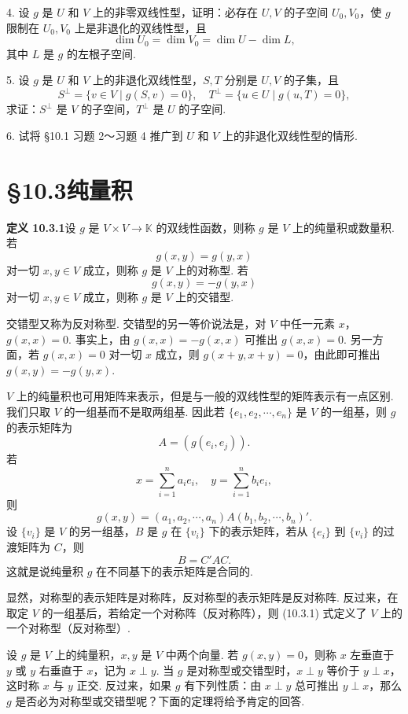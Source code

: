 \documentclass[UTF8,12pt,a4paper,fontset=fandol]{ctexart}
\begin{document}
4. 设 $g$ 是 $U$ 和 $V$ 上的非零双线性型，证明：必存在 $U,V$ 的子空间 $U_0,V_0$，使 $g$ 限制在 $U_0,V_0$ 上是非退化的双线性型，且
\[
  \dim U_0=\dim V_0=\dim U-\dim L,
\]
其中 $L$ 是 $g$ 的左根子空间.

5. 设 $g$ 是 $U$ 和 $V$ 上的非退化双线性型，$S,T$ 分别是 $U,V$ 的子集，且
\[
  S^\perp=\{v\in V\mid g(S,v)=0\},\quad T^\perp=\{u\in U\mid g(u,T)=0\},
\]
求证：$S^\perp$ 是 $V$ 的子空间，$T^\perp$ 是 $U$ 的子空间.

6. 试将 §10.1 习题 2～习题 4 推广到 $U$ 和 $V$ 上的非退化双线性型的情形.

\section*{§10.3\quad 纯量积}

\noindent\textbf{定义 10.3.1}\quad 设 $g$ 是 $V\times V\to\mathbb K$ 的双线性函数，则称 $g$ 是 $V$ 上的纯量积或数量积. 若
\[
  g(x,y)=g(y,x)
\]
对一切 $x,y\in V$ 成立，则称 $g$ 是 $V$ 上的对称型. 若
\[
  g(x,y)=-g(y,x)
\]
对一切 $x,y\in V$ 成立，则称 $g$ 是 $V$ 上的交错型.

交错型又称为反对称型. 交错型的另一等价说法是，对 $V$ 中任一元素 $x$，$g(x,x)=0$. 事实上，由 $g(x,x)=-g(x,x)$ 可推出 $g(x,x)=0$. 另一方面，若 $g(x,x)=0$ 对一切 $x$ 成立，则 $g(x+y,x+y)=0$，由此即可推出 $g(x,y)=-g(y,x)$.

$V$ 上的纯量积也可用矩阵来表示，但是与一般的双线性型的矩阵表示有一点区别. 我们只取 $V$ 的一组基而不是取两组基. 因此若 $\{e_1,e_2,\cdots,e_n\}$ 是 $V$ 的一组基，则 $g$ 的表示矩阵为
\[
  A=(g(e_i,e_j)).
\]
若
\[
  x=\sum_{i=1}^n a_ie_i,\quad y=\sum_{i=1}^n b_ie_i,
\]
则
\begin{equation}
  g(x,y)=(a_1,a_2,\cdots,a_n)A(b_1,b_2,\cdots,b_n)'.
  \tag{10.3.1}
\end{equation}
设 $\{v_i\}$ 是 $V$ 的另一组基，$B$ 是 $g$ 在 $\{v_i\}$ 下的表示矩阵，若从 $\{e_i\}$ 到 $\{v_i\}$ 的过渡矩阵为 $C$，则
\[
  B=C'AC.
\]
这就是说纯量积 $g$ 在不同基下的表示矩阵是合同的.

显然，对称型的表示矩阵是对称阵，反对称型的表示矩阵是反对称阵. 反过来，在取定 $V$ 的一组基后，若给定一个对称阵（反对称阵），则 (10.3.1) 式定义了 $V$ 上的一个对称型（反对称型）.

设 $g$ 是 $V$ 上的纯量积，$x,y$ 是 $V$ 中两个向量. 若 $g(x,y)=0$，则称 $x$ 左垂直于 $y$ 或 $y$ 右垂直于 $x$，记为 $x\perp y$. 当 $g$ 是对称型或交错型时，$x\perp y$ 等价于 $y\perp x$，这时称 $x$ 与 $y$ 正交. 反过来，如果 $g$ 有下列性质：由 $x\perp y$ 总可推出 $y\perp x$，那么 $g$ 是否必为对称型或交错型呢？下面的定理将给予肯定的回答.
\end{document}
